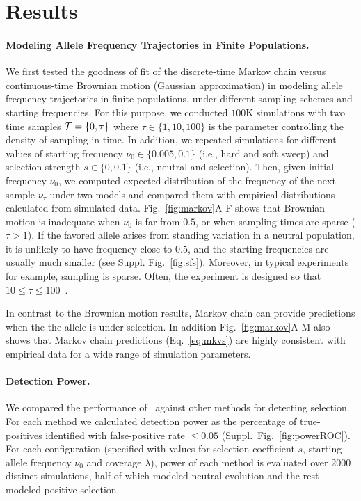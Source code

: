 \section{Results}
\paragraph{Modeling Allele Frequency Trajectories in Finite Populations.} 
We first tested the goodness of fit of the discrete-time Markov chain
versus continuous-time Brownian motion (Gaussian approximation) in modeling 
allele frequency
trajectories in finite populations, under different sampling schemes
and starting frequencies.  For this purpose, we conducted $100$K
simulations with two time samples ${\cal T}=\{0,\tau\}$ where $\tau\in
\{1,10,100\}$ is the parameter controlling the density of sampling
in time.  In addition, we repeated simulations for different values of
starting frequency $\nu_0\in\{0.005,0.1\}$ (i.e., hard and soft sweep)
and selection strength $s\in\{0,0.1\}$ (i.e., neutral and
selection). Then, given initial frequency $\nu_0$, we computed
expected distribution of the frequency of the next sample $\nu_\tau$
under two models and compared them with empirical distributions
calculated from simulated data.  Fig.~\ref{fig:markov}A-F shows that
Brownian motion is inadequate when $\nu_0$ is
far from $0.5$, or when sampling times are sparse ($\tau>1$). If the
favored allele arises from standing variation in a neutral population,
it is unlikely to have frequency close to $0.5$, and the starting
frequencies are usually much smaller (see
Suppl. Fig.~\ref{fig:sfs}). Moreover, in typical \dmel experiments for
example, sampling is sparse. Often, the experiment is designed so that
$10\le\tau\le100$~\cite{kofler2013guide, orozco2012adaptation,
  zhou2011experimental}.

In contrast to the Brownian motion results,  Markov chain can provide 
predictions when the the allele is under selection. In addition 
Fig.~\ref{fig:markov}A-M
also shows that Markov chain predictions (Eq.~\ref{eq:mkvs}) are
highly consistent with empirical data for a wide range of simulation
parameters.

\paragraph{Detection Power.} 
We compared the performance of \comale\ against other methods for
detecting selection. For each method we calculated detection power as the 
percentage of true-positives identified with false-positive rate $\le 0.05$
(Suppl.~Fig.~\ref{fig:powerROC}). For each
configuration (specified with values for selection coefficient $s$,
starting allele frequency $\nu_0$ and coverage $\lambda$), power of each method 
is evaluated over $2000$ distinct simulations, half of which modeled neutral 
evolution
and the rest modeled positive selection.

